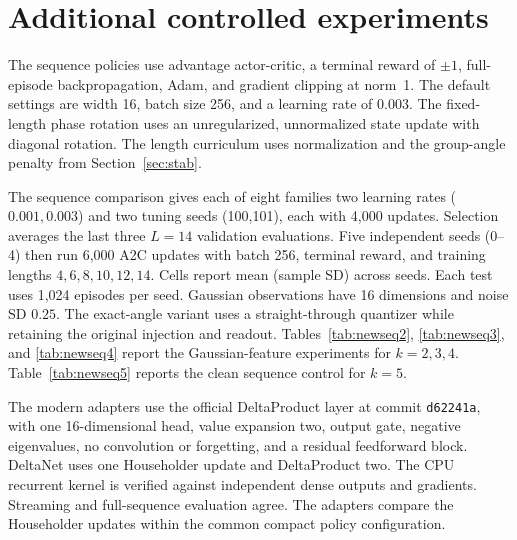 \section{Additional controlled experiments}
\label{app:additional}
 The sequence policies use advantage
actor-critic, a terminal reward of $\pm1$, full-episode backpropagation, Adam,
and gradient clipping at norm~1. The default settings are width 16, batch size
256, and a learning rate of $0.003$. The fixed-length phase rotation uses an
unregularized, unnormalized state update with diagonal rotation. The length
curriculum uses normalization and the group-angle penalty from
Section~\ref{sec:stab}.

The sequence comparison gives each of eight families two learning rates
($0.001,0.003$) and two tuning seeds (100,101), each with 4,000 updates.
Selection averages the last three $L=14$ validation evaluations. Five independent
seeds (0--4) then run 6,000 A2C updates with batch 256, terminal reward,
and training lengths $4,6,8,10,12,14$. Cells report mean (sample SD) across
seeds. Each test uses 1,024 episodes per seed.
Gaussian observations have 16 dimensions and noise SD $0.25$. The exact-angle
variant uses a straight-through quantizer while retaining the original injection
and readout. Tables~\ref{tab:newseq2}, \ref{tab:newseq3}, and \ref{tab:newseq4}
report the Gaussian-feature experiments for $k=2,3,4$.
Table~\ref{tab:newseq5} reports the clean sequence control for $k=5$.

The modern adapters use the official DeltaProduct layer at commit
\texttt{d62241a}, with one 16-dimensional head, value expansion two, output gate,
negative eigenvalues, no convolution or forgetting, and a residual feedforward
block. DeltaNet uses one Householder update and DeltaProduct two. The CPU
recurrent kernel is verified against independent dense outputs and gradients.
Streaming and full-sequence evaluation agree. The adapters compare the
Householder updates within the common compact policy configuration.

